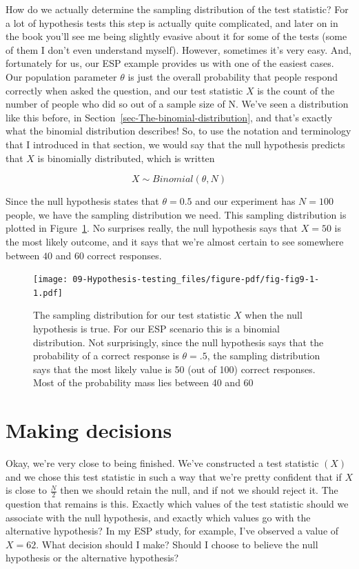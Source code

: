 \documentclass[
  a4paper,
]{book}
\begin{document}
How do we actually determine the sampling distribution of the test
statistic? For a lot of hypothesis tests this step is actually quite
complicated, and later on in the book you'll see me being slightly
evasive about it for some of the tests (some of them I don't even
understand myself). However, sometimes it's very easy. And, fortunately
for us, our ESP example provides us with one of the easiest cases. Our
population parameter \(\theta\) is just the overall probability that
people respond correctly when asked the question, and our test statistic
\(X\) is the count of the number of people who did so out of a sample
size of N. We've seen a distribution like this before, in
Section~\ref{sec-The-binomial-distribution}, and that's exactly what the
binomial distribution describes! So, to use the notation and terminology
that I introduced in that section, we would say that the null hypothesis
predicts that \(X\) is binomially distributed, which is written

\[X \sim Binomial(\theta,N)\]

Since the null hypothesis states that \(\theta = 0.5\) and our
experiment has \(N = 100\) people, we have the sampling distribution we
need. This sampling distribution is plotted in Figure~\ref{fig-fig9-1}.
No surprises really, the null hypothesis says that \(X = 50\) is the
most likely outcome, and it says that we're almost certain to see
somewhere between \(40\) and \(60\) correct responses.

\begin{figure}

\texttt{[image: 09-Hypothesis-testing\_files/figure-pdf/fig-fig9-1-1.pdf]} \hfill{}

\caption{\label{fig-fig9-1}The sampling distribution for our test
statistic \(X\) when the null hypothesis is true. For our ESP scenario
this is a binomial distribution. Not surprisingly, since the null
hypothesis says that the probability of a correct response is
\(\theta = .5\), the sampling distribution says that the most likely
value is 50 (out of 100) correct responses. Most of the probability mass
lies between 40 and 60}

\end{figure}

\hypertarget{making-decisions}{%
\section{Making decisions}\label{making-decisions}}

Okay, we're very close to being finished. We've constructed a test
statistic \((X)\) and we chose this test statistic in such a way that
we're pretty confident that if \(X\) is close to \(\frac{N}{2}\) then we
should retain the null, and if not we should reject it. The question
that remains is this. Exactly which values of the test statistic should
we associate with the null hypothesis, and exactly which values go with
the alternative hypothesis? In my ESP study, for example, I've observed
a value of \(X = 62\). What decision should I make? Should I choose to
believe the null hypothesis or the alternative hypothesis?
\end{document}
